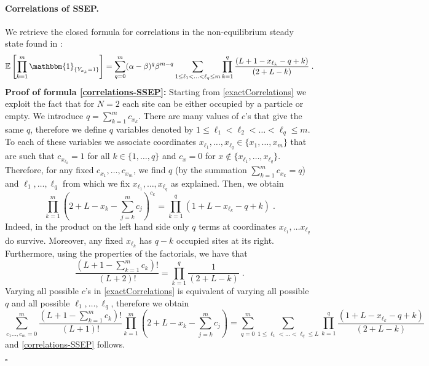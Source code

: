 \documentclass[10pt]{article}
\numberwithin{equation}{section}
\numberwithin{equation}{subsection}
\newcommand{\dt}{\;.}
\begin{document}
{\paragraph{Correlations of SSEP.}
We retrieve the closed formula for correlations in the non-equilibrium steady state found in \cite[(4.26)]{frassek2020eigenstates}:  
\begin{equation}\label{correlations-SSEP}
	\mathbb{E}\left[\prod_{k=1}^{m}\mathbbm{1}_{\{Y_{x_{k}}=1\}}\right]=\sum_{q=0}^{m}(\alpha-\beta)^{q}\beta^{m-q}\sum_{1\leq \ell_{1}<\ldots<\ell_{q}\leq m}\prod_{k=1}^{q}\frac{\left(L+1-x_{\ell_{k}}-q+k\right)}{(2+L-k)}\dt
\end{equation} 
\textbf{Proof of formula \eqref{correlations-SSEP}:} Starting from \eqref{exactCorrelations} we exploit {the fact that for $N=2$  each site can be either occupied by a particle or empty.} 
We introduce $q=\sum_{k=1}^{m}c_{x_{k}}$. There are many values of $c$'s that give the same $q$, therefore we define $q$ variables denoted by  
$1\leq \ell_{1}<\ell_{2}<\ldots<\ell_{q}\leq m$.  
To each of these variables we associate coordinates $x_{\ell_{1}},\ldots,x_{\ell_{q}}\in\{x_{1},\dots,x_{m}\}$ that are such that $c_{x_{\ell_{k}}}=1$ for all $k\in \{1,\ldots,q\}$ and $c_{x}=0$ for $x\notin \{x_{\ell_{1}},\ldots,x_{\ell_{q}}\}$. Therefore, for any fixed $c_{x_{1}},\ldots,c_{x_{m}}$, we find $q$ { (by the summation $\textstyle{\sum_{k=1}^{m}}c_{x_{k}}=q$)} 
 and $\ell_{1},\ldots,\ell_{q}$ from which we fix $x_{\ell_{1}},\ldots,x_{\ell_{q}}$ { as explained.} Then, we obtain  
	\begin{equation}
		\prod_{k=1}^{m}\left(2+L-x_{k}-\sum_{j=k}^{m}c_{j}\right)^{c_{k}}=\prod_{k=1}^{q}\left(1+L-x_{\ell_{k}}-q+k\right)\dt
	\end{equation}
Indeed, in the product on the left hand side only $q$ terms at coordinates $x_{\ell_{1}},\ldots x_{\ell_{q}}$ do survive. Moreover, any fixed $x_{\ell_{k}}$ has $q-k$ occupied sites at its right.
Furthermore, using the properties of the factorials, we have that 
\begin{equation}\label{Gamma-product}
	\frac{(L+1-\sum_{k=1}^{m}c_{k})!}{(L+2)!}=\prod_{k=1}^{q}\frac{1}{(2+L-k)}\dt
\end{equation}
Varying all possible $c$'s in \eqref{exactCorrelations} is equivalent of varying all possible $q$ and all possible $\ell_{1},\ldots,\ell_{q}$, therefore we obtain 
\begin{equation}
	\sum_{c_{1}\ldots,c_{m}=0}^{m}\frac{(L+1-\sum_{k=1}^{m}c_{k})!}{(L+1)!}\prod_{k=1}^{m}\left(2+L-x_{k}-\sum_{j=k}^{m}c_{j}\right)=\sum_{q=0}^{m}\sum_{1\leq \ell_{1}<\ldots<\ell_{q}\leq L}\prod_{k=1}^{q}\frac{(1+L-x_{\ell_{k}}-q+k)}{(2+L-k)}
\end{equation} 
and \eqref{correlations-SSEP} follows. 
\begin{flushright}
	$\square$
\end{flushright}
}
\end{document}
